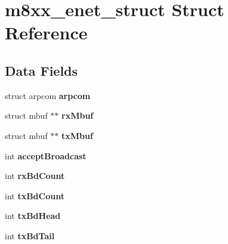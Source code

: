 \hypertarget{structm8xx__enet__struct}{}\section{m8xx\+\_\+enet\+\_\+struct Struct Reference}
\label{structm8xx__enet__struct}
\subsection*{Data Fields}
\begin{DoxyCompactItemize}
\item 
\mbox{\label{structm8xx__enet__struct_a632c65f2b0bf94bbbc639d2fbdb13bd9}} 
struct arpcom {\bfseries arpcom}
\item 
\mbox{\label{structm8xx__enet__struct_abb5a453b4d53c849472f5a00ba7fa646}} 
struct mbuf $\ast$$\ast$ {\bfseries rx\+Mbuf}
\item 
\mbox{\label{structm8xx__enet__struct_a94dab30e06c604f788803be86cfaaaca}} 
struct mbuf $\ast$$\ast$ {\bfseries tx\+Mbuf}
\item 
\mbox{\label{structm8xx__enet__struct_aad665c04469d09be3c1a17818daacdae}} 
int {\bfseries accept\+Broadcast}
\item 
\mbox{\label{structm8xx__enet__struct_aa0d9bdfb9327b36449e2ccd426eeac62}} 
int {\bfseries rx\+Bd\+Count}
\item 
\mbox{\label{structm8xx__enet__struct_af529d0022a94a92bd40a7bb8e0f268bf}} 
int {\bfseries tx\+Bd\+Count}
\item 
\mbox{\label{structm8xx__enet__struct_ae9a263a87edab8d54c4a27e6354a6330}} 
int {\bfseries tx\+Bd\+Head}
\item 
\mbox{\label{structm8xx__enet__struct_a3056ded4574153ceb564f7b7c0ea3d11}} 
int {\bfseries tx\+Bd\+Tail}
\item 
\mbox{\label{structm8xx__enet__struct_aa0ef4f4f606a91efec60f77c3dbe1a35}} 

\end{DoxyCompactItemize}
